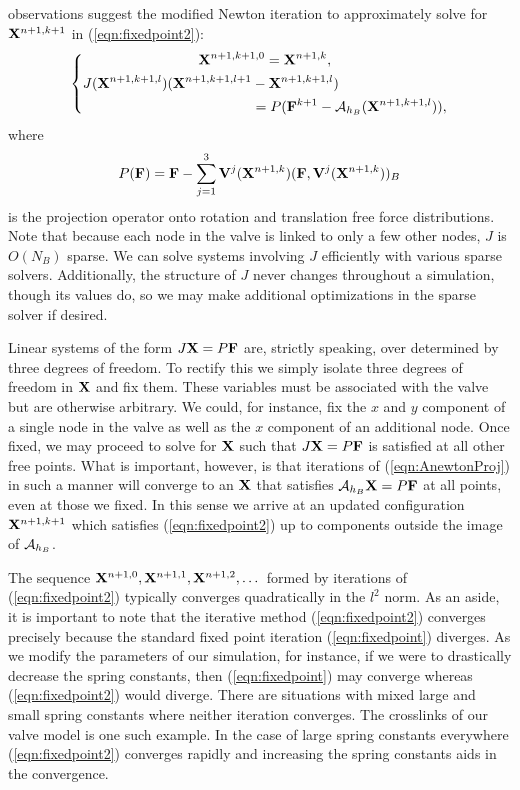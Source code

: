 observations suggest the modified Newton iteration to approximately solve for $\mathbf{X}^{n+1,k+1}$ in (\ref{eqn:fixedpoint2}):
\begin{equation}
\left\{
\begin{gathered}
\mathbf{X}^{n+1,k+1,0} = \mathbf{X}^{n+1,k} , \\
\begin{aligned}
J(\mathbf{X}^{n+1,k+1,l})(\mathbf{X}^{n+1,k+1,l+1}& - \mathbf{X}^{n+1,k+1,l})   \\
& = P(\mathbf{F}^{k+1} - \mathcal{A}_{h_B}(\mathbf{X}^{n+1,k+1,l})),
\end{aligned}
\end{gathered}
\right.
\label{eqn:AnewtonProj}
\end{equation}
where
\begin{equation}
P(\mathbf{F}) = \mathbf{F} - \sum_{j=1}^3 \mathbf{V}^j(\mathbf{X}^{n+1,k})(\mathbf{F},\mathbf{V}^j(\mathbf{X}^{n+1,k}))_B 
\label{eqn:project}
\end{equation}
is the projection operator onto rotation and translation free force distributions. Note that because each node in the valve is linked to only a few other nodes, $J$ is $O(N_B)$ sparse. We can solve systems involving $J$ efficiently with various sparse solvers. Additionally, the structure of $J$ never changes throughout a simulation, though its values do, so we may make additional optimizations in the sparse solver if desired.

Linear systems of the form $J\mathbf{X}=P\mathbf{F}$ are, strictly speaking, over determined by three degrees of freedom. To rectify this we simply isolate three degrees of freedom in $\mathbf{X}$ and fix them. These variables must be associated with the valve but are otherwise arbitrary. We could, for instance, fix the $x$ and $y$ component of a single node in the valve as well as the $x$ component of an additional node. Once fixed,  we may proceed to solve for $\mathbf{X}$ such that $J\mathbf{X}=P\mathbf{F}$ is satisfied at all other free points. What is important, however, is that iterations of (\ref{eqn:AnewtonProj}) in such a manner will converge to an $\mathbf{X}$ that satisfies $\mathcal{A}_{h_B}\mathbf{X}=P\mathbf{F}$ at all points, even at those we fixed. In this sense we arrive at an updated configuration $\mathbf{X}^{n+1,k+1}$ which satisfies (\ref{eqn:fixedpoint2}) up to components outside the image of $\mathcal{A}_{h_B}$.

The sequence $\mathbf{X}^{n+1,0}, \mathbf{X}^{n+1,1}, \mathbf{X}^{n+1,2}, \dots$ formed by iterations of (\ref{eqn:fixedpoint2}) typically converges quadratically in the $l^2$ norm.
As an aside, it is important to note that the iterative method (\ref{eqn:fixedpoint2}) converges precisely because the standard fixed point iteration (\ref{eqn:fixedpoint}) diverges. As we modify the parameters of our simulation, for instance,  if we were to drastically decrease the spring constants, then (\ref{eqn:fixedpoint}) may converge whereas (\ref{eqn:fixedpoint2}) would diverge. There are situations with mixed large and small spring constants where neither iteration converges. The crosslinks of our valve model is one such example. In the case of large spring constants everywhere (\ref{eqn:fixedpoint2}) converges rapidly and increasing the spring constants aids in the convergence.

